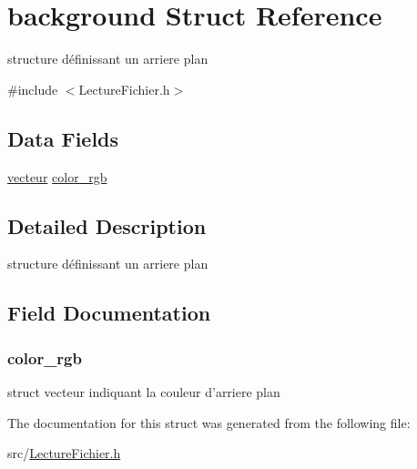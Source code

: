 \hypertarget{structbackground}{
\section{background Struct Reference}
\label{structbackground}
}


structure définissant un arriere plan  




{\ttfamily \#include $<$LectureFichier.h$>$}

\subsection*{Data Fields}
\begin{DoxyCompactItemize}
\item 
\hyperlink{structvecteur}{vecteur} \hyperlink{structbackground_a9efa06c385522a41b30ea3767811650a}{color\_\-rgb}
\end{DoxyCompactItemize}


\subsection{Detailed Description}
structure définissant un arriere plan 

\subsection{Field Documentation}
\hypertarget{structbackground_a9efa06c385522a41b30ea3767811650a}{
\subsubsection[{color\_\-rgb}]{ {\bf color\_\-rgb}}}
\label{structbackground_a9efa06c385522a41b30ea3767811650a}
struct vecteur indiquant la couleur d'arriere plan 

The documentation for this struct was generated from the following file:\begin{DoxyCompactItemize}
\item 
src/\hyperlink{_lecture_fichier_8h}{LectureFichier.h}\end{DoxyCompactItemize}
